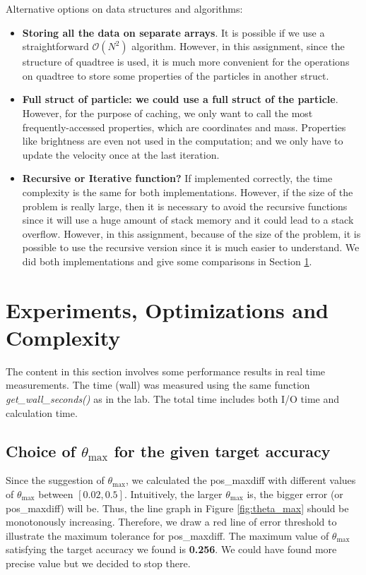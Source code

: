 \documentclass[12pt,oneside,a4paper]{article}
\begin{document}
Alternative options on data structures and algorithms:

\begin{itemize}
\item \textbf{Storing all the data on separate arrays}. It is possible if we use a straightforward $\mathcal{O}(N^2)$ algorithm. However, in this assignment, since the structure of quadtree is used, it is much more convenient for the operations on quadtree to store some properties of the particles in another struct.
\item \textbf{Full struct of particle: we could use a full struct of the particle}. However, for the purpose of caching, we only want to call the most frequently-accessed properties, which are coordinates and mass. Properties like brightness are even not used in the computation; and we only have to update the velocity once at the last iteration.
\item \textbf{Recursive or Iterative function?} If implemented correctly, the time complexity is the same for both implementations. However, if the size of the problem is really large, then it is necessary to avoid the recursive functions since it will use a huge amount of stack memory and it could lead to a stack overflow. However, in this assignment, because of the size of the problem, it is possible to use the recursive version since it is much easier to understand. We did both implementations and give some comparisons in Section \ref{sec:experiment}.
\end{itemize}

\section{Experiments, Optimizations and Complexity}
\label{sec:experiment}
The content in this section involves some performance results in real time measurements. The time (wall) was measured using the same function \textit{get\_wall\_seconds()} as in the lab. The total time includes both I/O time and calculation time.

\label{sec:optimization}
\subsection{Choice of $\theta_{\max}$ for the given target accuracy}
Since the suggestion of $\theta_{\max}$, we calculated the pos\_maxdiff with different values of $\theta_{\max}$ between $[0.02, 0.5]$. Intuitively, the larger $\theta_{\max}$ is, the bigger error (or pos\_maxdiff) will be. Thus, the line graph in Figure \ref{fig:theta_max} should be monotonously increasing. Therefore, we draw a red line of error threshold to illustrate the maximum tolerance for pos\_maxdiff. The maximum value of $\theta_{\max}$ satisfying the target accuracy we found is \textbf{0.256}. We could have found more precise value but we decided to stop there.
\end{document}
